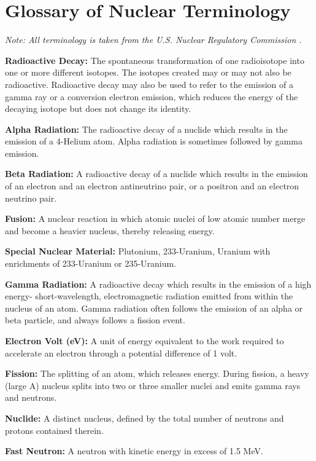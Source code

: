 \documentclass{report}
\begin{document}
\appendix
\chapter[Appendix A: Glossary of Nuclear Terminology]{Glossary of Nuclear Terminology}  \label{app:glossary}



\textit{Note: All terminology is taken from the U.S. Nuclear Regulatory Commission  \cite{USNRC2015}.}

\textbf{Radioactive Decay:} The spontaneous transformation of one radioisotope into one or more different isotopes. The isotopes created may or may not also be radioactive. Radioactive decay may also be used to refer to the emission of a gamma ray or a conversion electron emission, which reduces the energy of the decaying isotope but does not change its identity. 

\textbf{Alpha Radiation:} The radioactive decay of a nuclide which results in the emission of a 4-Helium atom. Alpha radiation is sometimes followed by gamma emission. 

\textbf{Beta Radiation:} A radioactive decay of a nuclide which results in the emission of an electron and an electron antineutrino pair, or a positron and an electron neutrino pair. 

\textbf{Fusion:} A nuclear reaction in which atomic nuclei of low atomic number merge and become a heavier nucleus, thereby releasing energy. 

\textbf{Special Nuclear Material:} Plutonium, 233-Uranium, Uranium with enrichments of 233-Uranium or 235-Uranium.

\textbf{Gamma Radiation:} A radioactive decay which results in the emission of a high energy- short-wavelength, electromagnetic radiation emitted from within the nucleus of an atom. Gamma radiation often follows the emission of an alpha or beta particle, and always follows a fission event. 

\textbf{Electron Volt (eV):} A unit of energy equivalent to the work required to accelerate an electron through a potential difference of 1 volt. 

\textbf{Fission:} The splitting of an atom, which releases energy. During fission, a heavy (large A) nucleus splits into two or three smaller nuclei and emits gamma rays and neutrons. 

\textbf{Nuclide:} A distinct nucleus, defined by the total number of neutrons and protons contained therein.  

\textbf{Fast Neutron:} A neutron with kinetic energy in excess of 1.5 MeV.
\end{document}
